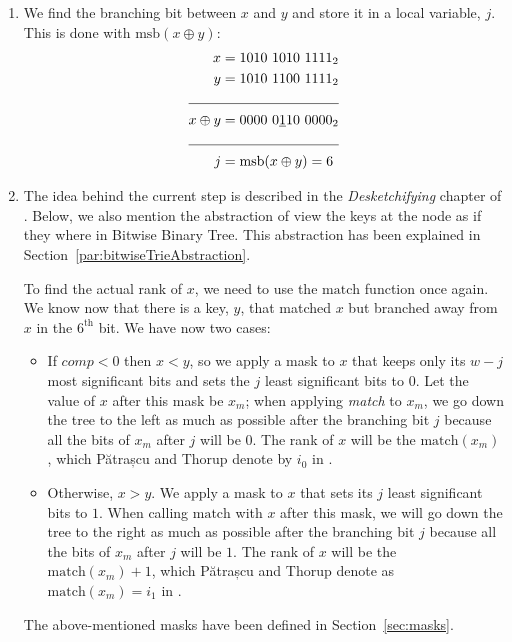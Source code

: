 \begin{enumerate}
    \item
    We find the branching bit between $x$ and $y$ and store it in a local variable, $j$. This is done with $\text{msb}(x \oplus y)$:
    \begin{align*}
        x &= 1010\ 1010\ 1111_2\\
        y &= 1010\ 1100\ 1111_2\\
        \cline{1-2}
        x \oplus y &= 0000\ 0\underline{1}10\ 0000_2\\
        \cline{1-2}
        j &= \text{msb}(x \oplus y) = 6
    \end{align*}
    
    \item
    The idea behind the current step is described in the \textit{Desketchifying} chapter of \cite{erikdemainelec12}. Below, we also mention the abstraction of view the keys at the node as if they where in Bitwise Binary Tree. This abstraction has been explained in Section~\ref{par:bitwiseTrieAbstraction}.
    
    To find the actual rank of $x$, we need to use the $\text{match}$ function once again. We know now that there is a key, $y$, that matched $x$ but branched away from $x$ in the $6^{\text{th}}$ bit.
    We have now two cases:
    \begin{itemize}
        \item
        If $comp < 0$ then $x < y$, so we apply a mask to $x$ that keeps only its $w-j$ most significant bits and sets the $j$ least significant bits to $0$. Let the value of $x$ after this mask be $x_m$; when applying \textit{match} to $x_m$, we go down the tree to the left as much as possible after the branching bit $j$ because all the bits of $x_m$ after $j$ will be $0$. The rank of $x$ will be the $\text{match}(x_m)$, which Pătrașcu and Thorup denote by $i_0$ in \cite{patrascu2014dynamic}.
        
        \item
        Otherwise, $x > y$. We apply a mask to $x$ that sets its $j$ least significant bits to $1$. When calling $\text{match}$ with $x$ after this mask, we will go down the tree to the right as much as possible after the branching bit $j$ because all the bits of $x_m$ after $j$ will be $1$. The rank of $x$ will be the $\text{match}(x_m) + 1$, which Pătrașcu and Thorup denote as $\text{match}(x_m) = i_1$ in \cite{patrascu2014dynamic}.
    \end{itemize}
    The above-mentioned masks have been defined in Section~\ref{sec:masks}.
    

\end{enumerate}
